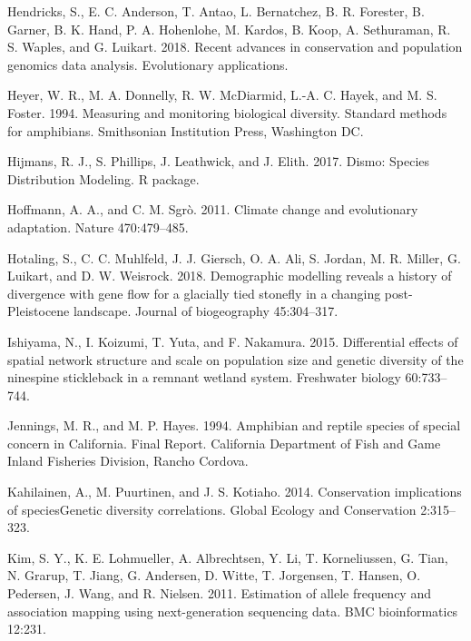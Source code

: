 \documentclass[proquest,12pt,final]{ucthesis-CA2012} %
\begin{document}
\begin{ucmainmatter}
\leavevmode\hypertarget{ref-hendricks_recent_2018}{}%
Hendricks, S., E. C. Anderson, T. Antao, L. Bernatchez, B. R. Forester,
B. Garner, B. K. Hand, P. A. Hohenlohe, M. Kardos, B. Koop, A.
Sethuraman, R. S. Waples, and G. Luikart. 2018. Recent advances in
conservation and population genomics data analysis. Evolutionary
applications.

\leavevmode\hypertarget{ref-heyer_measuring_1994}{}%
Heyer, W. R., M. A. Donnelly, R. W. McDiarmid, L.-A. C. Hayek, and M. S.
Foster. 1994. Measuring and monitoring biological diversity. Standard
methods for amphibians. Smithsonian Institution Press, Washington DC.

\leavevmode\hypertarget{ref-hijmans_dismo_2017}{}%
Hijmans, R. J., S. Phillips, J. Leathwick, and J. Elith. 2017. Dismo:
Species Distribution Modeling. R package.

\leavevmode\hypertarget{ref-hoffmann_climate_2011}{}%
Hoffmann, A. A., and C. M. Sgrò. 2011. Climate change and evolutionary
adaptation. Nature 470:479--485.

\leavevmode\hypertarget{ref-hotaling_demographic_2018}{}%
Hotaling, S., C. C. Muhlfeld, J. J. Giersch, O. A. Ali, S. Jordan, M. R.
Miller, G. Luikart, and D. W. Weisrock. 2018. Demographic modelling
reveals a history of divergence with gene flow for a glacially tied
stonefly in a changing post-Pleistocene landscape. Journal of
biogeography 45:304--317.

\leavevmode\hypertarget{ref-ishiyama_differential_2015}{}%
Ishiyama, N., I. Koizumi, T. Yuta, and F. Nakamura. 2015. Differential
effects of spatial network structure and scale on population size and
genetic diversity of the ninespine stickleback in a remnant wetland
system. Freshwater biology 60:733--744.

\leavevmode\hypertarget{ref-jennings_amphibian_1994}{}%
Jennings, M. R., and M. P. Hayes. 1994. Amphibian and reptile species of
special concern in California. Final Report. California Department of
Fish and Game Inland Fisheries Division, Rancho Cordova.

\leavevmode\hypertarget{ref-kahilainen_conservation_2014}{}%
Kahilainen, A., M. Puurtinen, and J. S. Kotiaho. 2014. Conservation
implications of speciesGenetic diversity correlations. Global Ecology
and Conservation 2:315--323.

\leavevmode\hypertarget{ref-kim_estimation_2011}{}%
Kim, S. Y., K. E. Lohmueller, A. Albrechtsen, Y. Li, T. Korneliussen, G.
Tian, N. Grarup, T. Jiang, G. Andersen, D. Witte, T. Jorgensen, T.
Hansen, O. Pedersen, J. Wang, and R. Nielsen. 2011. Estimation of allele
frequency and association mapping using next-generation sequencing data.
BMC bioinformatics 12:231.


\end{ucmainmatter}
\end{document}
